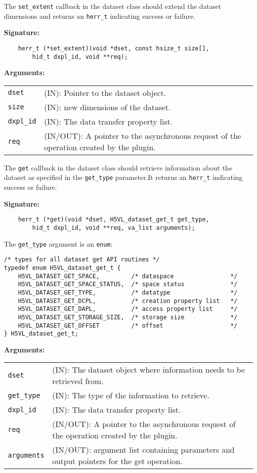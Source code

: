 The {\tt set\_extent} callback in the dataset class should extend the
dataset dimensions and returns an {\tt herr\_t} indicating success or
failure.

\textbf{Signature:}
\begin{lstlisting}
    herr_t (*set_extent)(void *dset, const hsize_t size[], 
        hid_t dxpl_id, void **req);
\end{lstlisting}

\textbf{Arguments:}\\
\begin{tabular}{l p{10cm}}
  {\tt dset} & (IN): Pointer to the dataset object.\\
  {\tt size} & (IN): new dimensions of the dataset.\\
  {\tt dxpl\_id} & (IN): The data transfer property list.\\
  {\tt req} & (IN/OUT): A pointer to the asynchronous request of the
  operation created by the plugin.\\
\end{tabular}

The {\tt get} callback in the dataset class should retrieve
information about the dataset as specified in the {\tt get\_type}
parameter.It returns an {\tt herr\_t} indicating success or failure.

\textbf{Signature:}
\begin{lstlisting}
    herr_t (*get)(void *dset, H5VL_dataset_get_t get_type, 
        hid_t dxpl_id, void **req, va_list arguments);
\end{lstlisting}

The {\tt get\_type} argument is an {\tt enum}:
\begin{lstlisting}
/* types for all dataset get API routines */
typedef enum H5VL_dataset_get_t {
    H5VL_DATASET_GET_SPACE,         /* dataspace                */
    H5VL_DATASET_GET_SPACE_STATUS,  /* space status             */
    H5VL_DATASET_GET_TYPE,          /* datatype                 */
    H5VL_DATASET_GET_DCPL,          /* creation property list   */
    H5VL_DATASET_GET_DAPL,          /* access property list     */
    H5VL_DATASET_GET_STORAGE_SIZE,  /* storage size             */
    H5VL_DATASET_GET_OFFSET         /* offset                   */
} H5VL_dataset_get_t;
\end{lstlisting}

\textbf{Arguments:}\\
\begin{tabular}{l p{10cm}}
  {\tt dset} & (IN): The dataset object where information needs to be
  retrieved from.\\
  {\tt get\_type} & (IN): The type of the information to retrieve.\\
  {\tt dxpl\_id} & (IN): The data transfer property list.\\
  {\tt req} & (IN/OUT): A pointer to the asynchronous request of the
  operation created by the plugin.\\
  {\tt arguments} & (IN/OUT): argument list containing parameters and
  output pointers for the get operation. \\
\end{tabular}

